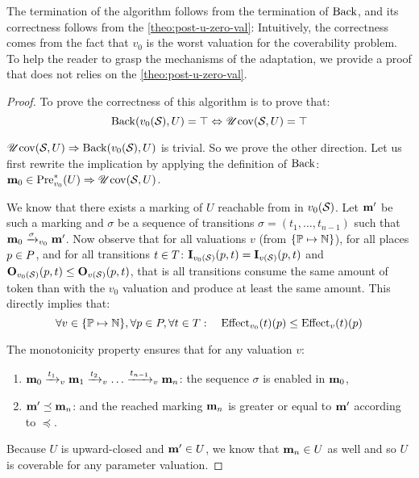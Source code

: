 The termination of the algorithm follows from the termination of $\back$, and its correctness follows from the \cref{theo:post-u-zero-val}:
Intuitively, the correctness comes from the fact that $v_0$ is the worst valuation for the coverability problem.
To help the reader to grasp the mechanisms of the adaptation, we provide a proof that does not relies on the \cref{theo:post-u-zero-val}.
\begin{proof}
  To prove the correctness of this algorithm is to prove that:
  \[
    \back(v_0(\namePPN), U) = \top \Leftrightarrow \UcovOp(\namePPN, U) = \top
  \]

$\UcovOp(\namePPN, U) \Rightarrow \back(v_0(\namePPN), U)$ is trivial. So we prove the other direction. Let us first rewrite the implication by applying the definition of $\back$: $\mari \in \Pre_{v_0}^*(U) \Rightarrow \UcovOp(\namePPN, U)$.


  We know that there exists a marking of $U$ reachable from \mari in $v_0(\namePPN)$.
  Let $\marp$ be such a marking and $\sigma$ be a sequence of transitions $\sigma = (t_1, \dots, t_{n-1})$ such that $\mari \fire[{v_0}]{\sigma} \marp$.
  Now observe that for all valuations $v$ (from $\{\parameters \mapsto \naturals\}$), for all places $p \in \places$, and for all transitions $t \in \transitions$: $\matI_{v_0(\namePPN)}(p,t) = \matI_{v(\namePPN)}(p,t)$ and $\matO_{v_0(\namePPN)}(p,t) \leq \matO_{v(\namePPN)}(p,t)$, that is all transitions consume the same amount of token than with the $v_0$ valuation and produce at least the same amount. This directly implies that: 
  \[
    \forall v \in \{\parameters \mapsto \naturals\}, \forall p \in \places, \forall t \in \transitions :
  \quad
  \Effect_{v_0}(t)(p) \leq \Effect_v(t)(p)
  \]

The monotonicity property ensures that for any valuation $v$:
  \begin{enumerate}
    \item $\mari \fire[v]{t_1} \mar_1 \fire[v]{t_2} \dots \fire[v]{t_{n-1}} \mar_n$: the sequence $\sigma$ is enabled  in $\mari$,
    \item $\marp \preceq \mar_n$: and the reached marking $\mar_n$ is greater or equal to $\marp$ according to $\preceq$.
  \end{enumerate}

  Because $U$ is upward-closed and $\marp \in U$, we know that $\mar_n \in U$ as well and so $U$ is coverable for any parameter valuation.
\end{proof}

